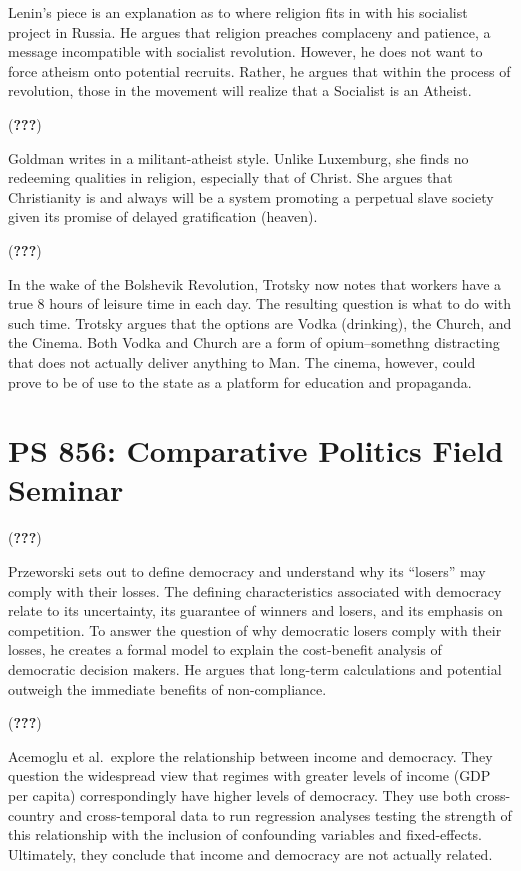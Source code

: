 \documentclass[
  english,
  man]{apa6}
\begin{document}
Lenin's piece is an explanation as to where religion fits in with his socialist project in Russia. He argues that religion preaches complaceny and patience, a message incompatible with socialist revolution. However, he does not want to force atheism onto potential recruits. Rather, he argues that within the process of revolution, those in the movement will realize that a Socialist is an Atheist.

({\textbf{???}})

Goldman writes in a militant-atheist style. Unlike Luxemburg, she finds no redeeming qualities in religion, especially that of Christ. She argues that Christianity is and always will be a system promoting a perpetual slave society given its promise of delayed gratification (heaven).

({\textbf{???}})

In the wake of the Bolshevik Revolution, Trotsky now notes that workers have a true 8 hours of leisure time in each day. The resulting question is what to do with such time. Trotsky argues that the options are Vodka (drinking), the Church, and the Cinema. Both Vodka and Church are a form of opium--somethng distracting that does not actually deliver anything to Man. The cinema, however, could prove to be of use to the state as a platform for education and propaganda.

\hypertarget{ps-856-comparative-politics-field-seminar}{%
\section{PS 856: Comparative Politics Field Seminar}\label{ps-856-comparative-politics-field-seminar}}

({\textbf{???}})

Przeworski sets out to define democracy and understand why its \enquote{losers} may comply with their losses. The defining characteristics associated with democracy relate to its uncertainty, its guarantee of winners and losers, and its emphasis on competition. To answer the question of why democratic losers comply with their losses, he creates a formal model to explain the cost-benefit analysis of democratic decision makers. He argues that long-term calculations and potential outweigh the immediate benefits of non-compliance.

({\textbf{???}})

Acemoglu et al.~explore the relationship between income and democracy. They question the widespread view that regimes with greater levels of income (GDP per capita) correspondingly have higher levels of democracy. They use both cross-country and cross-temporal data to run regression analyses testing the strength of this relationship with the inclusion of confounding variables and fixed-effects. Ultimately, they conclude that income and democracy are not actually related.
\end{document}
